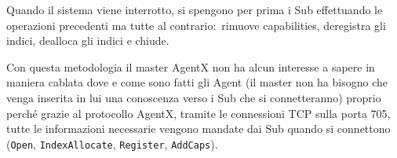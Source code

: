 \noindent Quando il sistema viene interrotto, si spengono per prima i Sub effettuando le operazioni precedenti ma tutte al contrario:\ rimuove capabilities, deregistra gli indici, dealloca gli indici e chiude.\

Con questa metodologia il master AgentX non ha alcun interesse a sapere in maniera cablata dove e come sono fatti gli Agent (il master non ha bisogno che venga inserita in lui una conoscenza verso i Sub che si connetteranno) proprio perché grazie al protocollo AgentX, tramite le connessioni TCP sulla porta 705, tutte le informazioni necessarie vengono mandate dai Sub quando si connettono (\texttt{Open}, \texttt{IndexAllocate}, \texttt{Register}, \texttt{AddCaps}).
